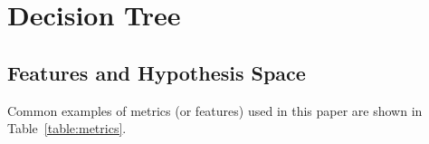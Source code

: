 \section{Decision Tree}



\subsection{Features and Hypothesis Space}



Common examples of metrics (or features) used in this paper are shown in Table~\ref{table:metrics}.

